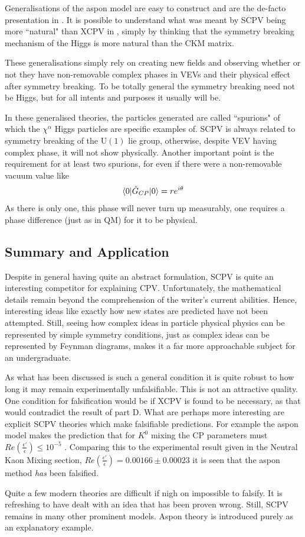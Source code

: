 Generalisations of the aspon model are easy to construct and are the de-facto presentation in \cite{SCPV5}. It is possible to understand what was meant by SCPV being more ``natural" than XCPV in \cite{SCPV1}, simply by thinking that the symmetry breaking mechanism of the Higgs is more natural than the CKM matrix. 


These generalisations simply rely on creating new fields and observing whether or not they have non-removable complex phases in VEVs and their physical effect after symmetry breaking. To be totally general the symmetry breaking need not be Higgs, but for all intents and purposes it usually will be.

In these generalised theories, the particles generated are called ``spurions" of which the $\chi^\alpha$ Higgs particles are specific examples of. SCPV is always related to symmetry breaking of the $\mathrm{U}(1)$ lie group, otherwise, despite VEV having complex phase, it will not show physically. Another important point is the requirement for at least two spurions, for even if there were a non-removable vacuum value like
\begin{align*}
\braket{0|\hat{G}_{CP}|0} = r e^{i\theta}
\end{align*}
As there is only one, this phase will never turn up measurably, one requires a phase difference (just as in QM) for it to be physical.

\subsection{Summary and Application}
Despite in general having quite an abstract formulation, SCPV is quite an interesting competitor for explaining CPV. Unfortunately, the mathematical details remain beyond the comprehension of the writer's current abilities. Hence, interesting ideas like exactly how new states are predicted have not been attempted. Still, seeing how complex ideas in particle physical physics can be represented by simple symmetry conditions, just as complex ideas can be represented by Feynman diagrams, makes it a far more approachable subject for an undergraduate.

As what has been discussed is such a general condition it is quite robust to how long it may remain experimentally unfalsifiable. This is not an attractive quality. One condition for falsification would be if XCPV is found to be necessary, as that would contradict the result of part D. What are perhaps more interesting are explicit SCPV theories which make falsifiable predictions. For example the aspon model makes the prediction that for $K^0$ mixing the CP parameters must $Re(\frac{\epsilon'}{\epsilon}) \leq 10^{-5}$ \cite{SCPV7}. Comparing this to the experimental result given in the Neutral Kaon Mixing section, $Re(\frac{\epsilon'}{\epsilon})=0.00166 \pm 0.00023$ it is seen that the aspon method \textit{has} been falsified. 

Quite a few modern theories are difficult if nigh on impossible to falsify. It is refreshing to have dealt with an idea that has been proven wrong. Still, SCPV remains in many other prominent models. Aspon theory is introduced purely as an explanatory example.
